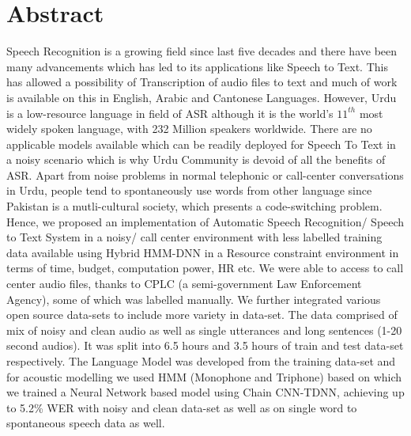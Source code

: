 \section{Abstract}
Speech Recognition is a growing field since last five decades and there have been many advancements which has led to its applications like Speech to Text. This has allowed a possibility of Transcription of audio files to text and much of work is available on this in English, Arabic and Cantonese Languages. However, Urdu is a low-resource language in field of ASR although it is the world's $11^{th}$ most widely spoken language, with 232 Million speakers worldwide. There are no applicable models available which can be readily deployed for Speech To Text in a noisy scenario which is why Urdu Community is devoid of all the benefits of ASR. Apart from noise problems in normal telephonic or call-center conversations in Urdu, people tend to spontaneously use words from other language since Pakistan is a mutli-cultural society, which presents a code-switching problem. Hence, we proposed an implementation of Automatic Speech Recognition/ Speech to Text System in a noisy/ call center environment with less labelled training data available using Hybrid HMM-DNN in a Resource constraint environment in terms of time, budget, computation power, HR etc. We were able to access to call center audio files, thanks to CPLC \cite{cplc_cplc_nodate} (a semi-government Law Enforcement Agency), some of which was labelled manually. We further integrated various open source data-sets to include more variety in data-set. The data comprised of mix of noisy and clean audio as well as single utterances and long sentences (1-20 second audios). It was split into 6.5 hours and 3.5 hours of train and test data-set respectively. The Language Model was developed from the training data-set and for acoustic modelling we used HMM (Monophone and Triphone) based on which we trained a Neural Network based model using Chain CNN-TDNN, achieving up to 5.2\% WER with noisy and clean data-set as well as on single word to spontaneous speech data as well.

